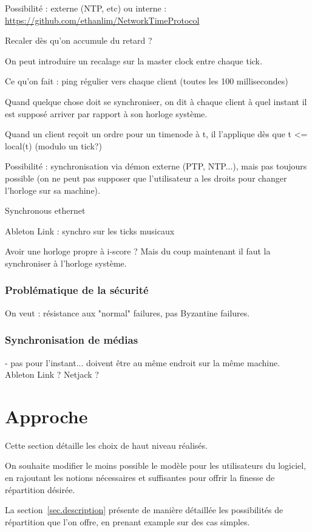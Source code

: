 \documentclass{article}
\begin{document}
Possibilité : externe (NTP, etc) ou interne : \url{https://github.com/ethanlim/NetworkTimeProtocol}

Recaler dès qu'on accumule du retard ?



On peut introduire un recalage sur la master clock entre chaque tick.

Ce qu'on fait : ping régulier vers chaque client (toutes les 100 millisecondes)

Quand quelque chose doit se synchroniser, on dit à chaque client à quel instant il est supposé arriver par rapport à son horloge système.

Quand un client reçoit un ordre pour un timenode à t, il l'applique dès que t <= local(t) (modulo un tick?)



Possibilité : synchronisation via démon externe (PTP, NTP...), mais pas toujours possible (on ne peut pas supposer que l'utilisateur a les droits pour changer l'horloge sur sa machine).

Synchronous ethernet

Ableton Link : synchro sur les ticks musicaux 

Avoir une horloge propre à i-score ? Mais du coup maintenant il faut la synchroniser à l'horloge système. 

\subsubsection{Problématique de la sécurité}
On veut : résistance aux "normal" failures, pas Byzantine failures.

\subsubsection{Synchronisation de médias}
- pas pour l'instant... doivent être au même endroit sur la même machine.
Ableton Link ? Netjack ?

\section{Approche}
Cette section détaille les choix de haut niveau réalisés.

On souhaite modifier le moins possible le modèle pour les utilisateurs du logiciel, 
en rajoutant les notions nécessaires et suffisantes pour offrir la finesse de répartition désirée.

La section~\ref{sec.description} présente de manière détaillée les possibilités 
de répartition que l'on offre, en prenant example sur des cas simples.
\end{document}
